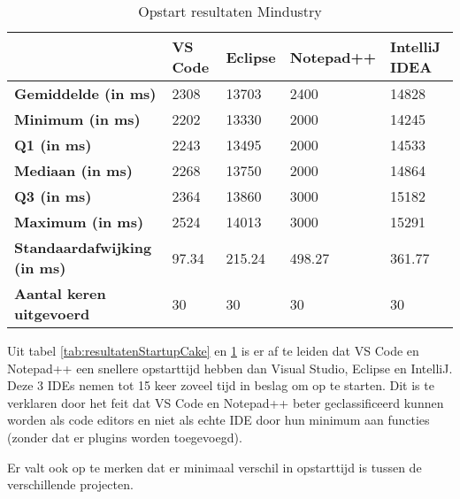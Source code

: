 \begin{table}[h!]
	\centering
	\begin{tabular}{ l l l l l }
		\hline
		                                    & \textbf{VS Code} & \textbf{Eclipse} & \textbf{Notepad++} & \textbf{IntelliJ IDEA} \\
		\hline
		\textbf{Gemiddelde (in ms)}         & 2308             & 13703            & 2400               & 14828                  \\[1ex]

		\textbf{Minimum (in ms) }           & 2202             & 13330            & 2000               & 14245                  \\
		\textbf{Q1 (in ms)}                 & 2243             & 13495            & 2000               & 14533                  \\
		\textbf{Mediaan (in ms)}            & 2268             & 13750            & 2000               & 14864                  \\
		\textbf{Q3 (in ms)}                 & 2364             & 13860            & 3000               & 15182                  \\
		\textbf{Maximum (in ms)}            & 2524             & 14013            & 3000               & 15291                  \\[1ex]

		\textbf{Standaardafwijking (in ms)} & 97.34            & 215.24           & 498.27             & 361.77                 \\
		\textbf{Aantal keren uitgevoerd}    & 30               & 30               & 30                 & 30                     \\
		\hline
	\end{tabular}
	\caption{Opstart resultaten Mindustry}
	\label{tab:resultatenStartupMindustry}
\end{table}

Uit tabel \ref{tab:resultatenStartupCake} en \ref{tab:resultatenStartupMindustry} is er af te leiden dat VS Code en Notepad++ een snellere opstarttijd hebben dan Visual Studio, Eclipse en IntelliJ. Deze 3 IDEs nemen  tot 15 keer zoveel tijd in beslag om op te starten. Dit is te verklaren door het feit dat VS Code en Notepad++ beter geclassificeerd kunnen worden als code editors en niet als echte IDE door hun minimum aan functies (zonder dat er plugins worden toegevoegd). 

Er valt ook op te merken dat er minimaal verschil in opstarttijd is tussen de verschillende projecten.

